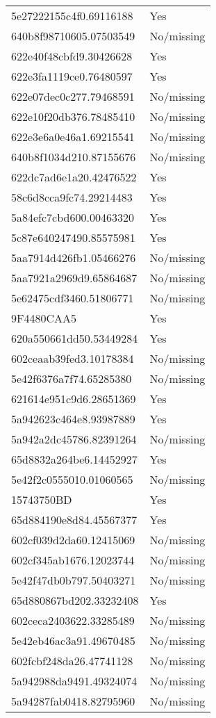 \begin{tabular}{ll}
5e27222155c4f0.69116188 & Yes \\
640b8f98710605.07503549 & No/missing \\
622e40f48cbfd9.30426628 & Yes \\
622e3fa1119ce0.76480597 & Yes \\
622e07dec0c277.79468591 & No/missing \\
622e10f20db376.78485410 & No/missing \\
622e3e6a0e46a1.69215541 & No/missing \\
640b8f1034d210.87155676 & No/missing \\
622dc7ad6e1a20.42476522 & Yes \\
58c6d8cca9fc74.29214483 & Yes \\
5a84efc7cbd600.00463320 & Yes \\
5c87e640247490.85575981 & Yes \\
5aa7914d426fb1.05466276 & No/missing \\
5aa7921a2969d9.65864687 & No/missing \\
5e62475cdf3460.51806771 & No/missing \\
9F4480CAA5 & Yes \\
620a550661dd50.53449284 & Yes \\
602ceaab39fed3.10178384 & No/missing \\
5e42f6376a7f74.65285380 & No/missing \\
621614e951c9d6.28651369 & Yes \\
5a942623c464e8.93987889 & Yes \\
5a942a2dc45786.82391264 & No/missing \\
65d8832a264be6.14452927 & Yes \\
5e42f2c0555010.01060565 & No/missing \\
15743750BD & Yes \\
65d884190e8d84.45567377 & Yes \\
602cf039d2da60.12415069 & No/missing \\
602cf345ab1676.12023744 & No/missing \\
5e42f47db0b797.50403271 & No/missing \\
65d880867bd202.33232408 & Yes \\
602ceca2403622.33285489 & No/missing \\
5e42eb46ac3a91.49670485 & No/missing \\
602fcbf248da26.47741128 & No/missing \\
5a942988da9491.49324074 & No/missing \\
5a94287fab0418.82795960 & No/missing \\

\end{tabular}
